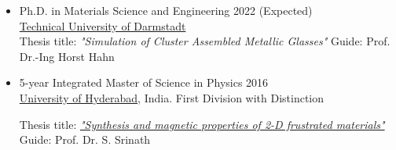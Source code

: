 \begin{itemize}[noitemsep]
\item Ph.D. in Materials Science and Engineering \hfill 2022 (Expected) \\
\href{https://www.mawi.tu-darmstadt.de/materialwissenschaft/willkommen_mawi/index.en.jsp}{Technical University of Darmstadt} \\ %
Thesis title: \emph{"Simulation of Cluster Assembled Metallic Glasses"} \hfill {Guide: Prof. Dr.-Ing Horst Hahn}
\end{itemize}

\begin{itemize}[noitemsep]
\item 5-year Integrated Master of Science in Physics \hfill 2016 \\
\href{http://uohyd.ac.in/}{University of Hyderabad}, India. \hfill First Division with Distinction

Thesis title: \href{http://syamalpraneeth.weebly.com/uploads/9/5/9/2/95928492/msc_presentation.pdf}{\emph{"Synthesis and magnetic properties of 2-D frustrated materials"}} \hfill {Guide: Prof. Dr. S. Srinath}
\end{itemize}

